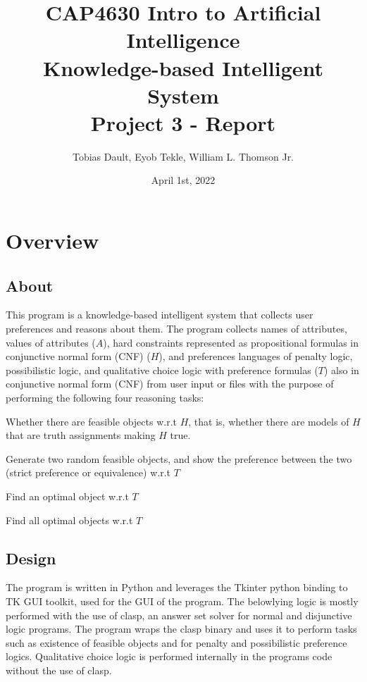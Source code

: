 \documentclass[12pt]{report}
\title{\textbf{CAP4630 Intro to Artificial Intelligence \\ Knowledge-based
Intelligent System \\ Project 3 - Report}}
\author{Tobias Dault, Eyob Tekle, William L. Thomson Jr.}
\date{April 1st, 2022}
\begin{document}
\maketitle
\tableofcontents
\thispagestyle{empty}

\chapter{Overview}
\section{About}
This program is a knowledge-based intelligent system that collects user preferences and reasons about them. The program collects names of attributes, values of attributes ($A$), hard constraints represented as propositional formulas in conjunctive normal form (CNF) ($H$), and preferences languages of penalty logic, possibilistic logic, and qualitative choice logic with preference formulas ($T$) also in conjunctive normal form (CNF) from user input or files with the purpose of performing the following four reasoning tasks: \\

\begin{description}[style=multiline,leftmargin=12em]
  \item [Existence of Feasible Objects] Whether there are feasible objects w.r.t $H$,
that is, whether there are models of $H$ that are truth assignments making $H$ true.
  \item [Exemplification] Generate two random feasible objects, and show the preference between the two (strict preference or equivalence) w.r.t $T$
  \item [Optimization] Find an optimal object w.r.t $T$
  \item [Omni-Optimization] Find all optimal objects w.r.t $T$
\end{description}

\section{Design}
The program is written in Python and leverages the Tkinter python binding to TK GUI toolkit, used for the GUI of the program. The belowlying logic is mostly performed with the use of clasp, an answer set solver for normal and disjunctive logic programs. The program wraps the clasp binary and uses it to perform tasks such as existence of feasible objects and for penalty and possibilistic preference logics. Qualitative choice logic is performed internally in the programs code without the use of clasp.
\end{document}

